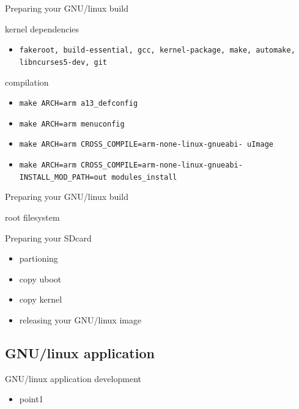 \documentclass{beamer}
\begin{document}
 
 \begin{frame}{Preparing your GNU/linux build}
   \begin{block}{kernel dependencies}
     \begin{itemize}
     \item {\tt fakeroot, build-essential, gcc, kernel-package, make,
       automake, libncurses5-dev, git}
     \end{itemize} 
   \end{block}

   \begin{block}{compilation}
     \begin{itemize}
     \item {\tt make ARCH=arm a13\_defconfig}
     \item {\tt make ARCH=arm menuconfig}
     \item {\tt make ARCH=arm CROSS\_COMPILE=arm-none-linux-gnueabi-
       uImage}
     \item {\tt make ARCH=arm CROSS\_COMPILE=arm-none-linux-gnueabi-
       INSTALL\_MOD\_PATH=out modules\_install}
     \end{itemize} 
   \end{block}
 \end{frame}

 \begin{frame}{Preparing your GNU/linux build}
   \begin{block}{root filesystem}
   \end{block} 

   \begin{block}{Preparing your SDcard}
     \begin{itemize}
     \item partioning
     \item copy uboot
     \item copy kernel
     \item releasing your GNU/linux image
     \end{itemize}
   \end{block}
 \end{frame}
  
 \subsection{GNU/linux application}
 \begin{frame}{GNU/linux application development}
   \begin{block}{}
     \begin{itemize}
     \item point1 
     \end{itemize}
   \end{block}
 \end{frame}
\end{document}
